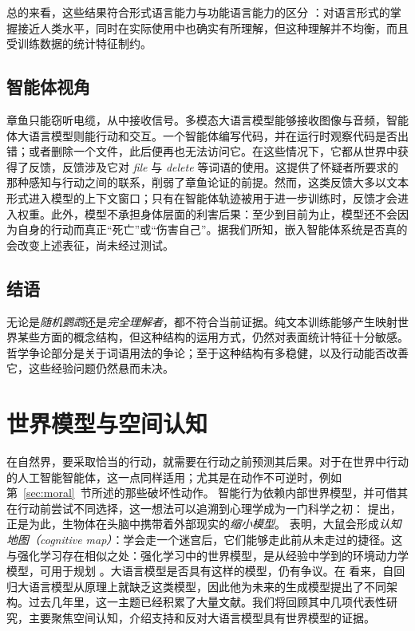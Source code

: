 总的来看，这些结果符合形式语言能力与功能语言能力的区分 \citep{mahowald2023dissociating}：对语言形式的掌握接近人类水平，同时在实际使用中也确实有所理解，但这种理解并不均衡，而且受训练数据的统计特征制约。

\subsection{智能体视角}
章鱼只能窃听电缆，从中接收信号。多模态大语言模型能够接收图像与音频，智能体大语言模型则能行动和交互。一个智能体编写代码，并在运行时观察代码是否出错；或者删除一个文件，此后便再也无法访问它。在这些情况下，它都从世界中获得了反馈，反馈涉及它对 {\em file} 与 {\em delete} 等词语的使用。这提供了怀疑者所要求的那种感知与行动之间的联系，削弱了章鱼论证的前提。然而，这类反馈大多以文本形式进入模型的上下文窗口；只有在智能体轨迹被用于进一步训练时，反馈才会进入权重。此外，模型不承担身体层面的利害后果：至少到目前为止，模型还不会因为自身的行动而真正“死亡”或“伤害自己”。据我们所知，嵌入智能体系统是否真的会改变上述表征，尚未经过测试。

\subsection{结语}
无论是\emph{随机鹦鹉}还是\emph{完全理解者}，都不符合当前证据。纯文本训练能够产生映射世界某些方面的概念结构，但这种结构的运用方式，仍然对表面统计特征十分敏感。哲学争论部分是关于词语用法的争论；至于这种结构有多稳健，以及行动能否改善它，这些经验问题仍然悬而未决。

\section{世界模型与空间认知}\label{sec:worldmodelscog}\label{sec:worldmodels}
在自然界，要采取恰当的行动，就需要在行动之前预测其后果。对于在世界中行动的人工智能智能体，这一点同样适用；尤其是在动作不可逆时，例如第~\ref{sec:moral}~节所述的那些破坏性动作。
智能行为依赖内部世界模型，并可借其在行动前尝试不同选择，这一想法可以追溯到心理学成为一门科学之初：\citet{craik1943nature} 提出，正是为此，生物体在头脑中携带着外部现实的{\em 缩小模型}。\citet{tolman1948cognitive} 表明，大鼠会形成\emph{认知地图（cognitive map）}：学会走一个迷宫后，它们能够走此前从未走过的捷径。这与强化学习存在相似之处：强化学习中的世界模型，是从经验中学到的环境动力学模型，可用于规划 \citep{ha2018world}。大语言模型是否具有这样的模型，仍有争议。在 \citet{lecun2022path} 看来，自回归大语言模型从原理上就缺乏这类模型，因此他为未来的生成模型提出了不同架构。过去几年里，这一主题已经积累了大量文献。我们将回顾其中几项代表性研究，主要聚焦空间认知，介绍支持和反对大语言模型具有世界模型的证据。

